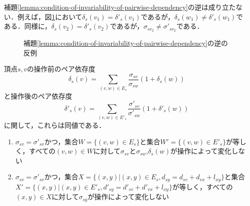 補題\ref{lemma:condition-of-invariability-of-pairwise-dependency}の逆は成り立たない．例えば，図\ref{fig:pd-invariability-counterexample}において$\delta_s(v_1)=\delta'_s(v_1)$であるが，$\delta_s(w_1)\neq\delta'_s(w_1)$である．同様に，$\delta_s(v_2)=\delta'_s(v_2)$であるが，$\sigma_{sv_2}\neq\sigma'_{sv_2}$である．

\begin{figure}[tb]
  \centering
  \def\svgwidth{.45\linewidth}
  
  \caption{補題\ref{lemma:condition-of-invariability-of-pairwise-dependency}の逆の反例}
  \label{fig:pd-invariability-counterexample}
\end{figure}

\begin{lemma}
  \label{lemma:transformation-of-invariability-of-pairwise-dependency}
  頂点$s,v$の操作前のペア依存度
  \begin{equation}
    \label{eq:pairwise-dependency}
    \delta_s(v)=\sum_{(v,w)\in E_s}\frac{\sigma_{sv}}{\sigma_{sw}}(1+\delta_s(w))
  \end{equation}
  と操作後のペア依存度
  \begin{equation}
    \label{eq:pairwise-dependency-after-update}
    \delta'_s(v)=\sum_{(v,w)\in E'_s}\frac{\sigma'_{sv}}{\sigma'_{sw}}(1+\delta'_s(w))
  \end{equation}
  に関して，これらは同値である．
  \begin{enumerate}
  \item $\sigma_{sv}=\sigma'_{sv}$かつ，集合$W=\{(v,w)\in E_s\}$と集合$W'=\{(v,w)\in E'_s\}$が等しく，すべての$(v,w)\in W$に対して$\sigma_{sv}$と$\sigma_{sw}$,$\delta_s(w)$が操作によって変化しない
    \label{item:explicit-invariability-of-pairwise-dependency}
  \item $\sigma_{sv}=\sigma'_{sv}$かつ，集合$X=\{(x,y)|(x,y)\in E_s,d_{sy}=d_{sv}+d_{vx}+l_{xy}\}$と集合$X'=\{(x,y)|(x,y)\in E'_s,d'_{sy}=d'_{sv}+d'_{vx}+l_{xy}\}$が等しく，すべての$(x,y)\in X$に対して$\sigma_{sy}$が操作によって変化しない
    \label{item:implicit-invariability-of-pairwise-dependency}
  \end{enumerate}
\end{lemma}
